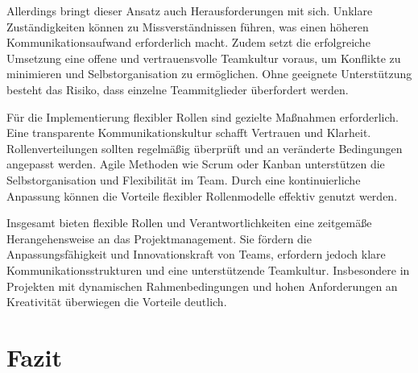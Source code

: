 \documentclass[ngerman]{seminarvorlage}
\begin{document}
Allerdings bringt dieser Ansatz auch Herausforderungen mit sich. Unklare Zuständigkeiten können zu Missverständnissen führen, was einen höheren Kommunikationsaufwand erforderlich macht. Zudem setzt die erfolgreiche Umsetzung eine offene und vertrauensvolle Teamkultur voraus, um Konflikte zu minimieren und Selbstorganisation zu ermöglichen. Ohne geeignete Unterstützung besteht das Risiko, dass einzelne Teammitglieder überfordert werden.  

Für die Implementierung flexibler Rollen sind gezielte Maßnahmen erforderlich. Eine transparente Kommunikationskultur schafft Vertrauen und Klarheit. Rollenverteilungen sollten regelmäßig überprüft und an veränderte Bedingungen angepasst werden. Agile Methoden wie Scrum oder Kanban unterstützen die Selbstorganisation und Flexibilität im Team. Durch eine kontinuierliche Anpassung können die Vorteile flexibler Rollenmodelle effektiv genutzt werden.  

Insgesamt bieten flexible Rollen und Verantwortlichkeiten eine zeitgemäße Herangehensweise an das Projektmanagement. Sie fördern die Anpassungsfähigkeit und Innovationskraft von Teams, erfordern jedoch klare Kommunikationsstrukturen und eine unterstützende Teamkultur. Insbesondere in Projekten mit dynamischen Rahmenbedingungen und hohen Anforderungen an Kreativität überwiegen die Vorteile deutlich.  
\cite{luhr_projektrollen_2023}

\section{Fazit}


%
%


\end{document}
